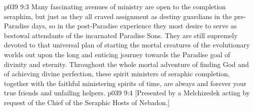 \vs p039 9:3 Many fascinating avenues of ministry are open to the completion seraphim, but just as they all craved assignment as destiny guardians in the pre\hyp{}Paradise days, so in the post\hyp{}Paradise experience they most desire to serve as bestowal attendants of the incarnated Paradise Sons. They are still supremely devoted to that universal plan of starting the mortal creatures of the evolutionary worlds out upon the long and enticing journey towards the Paradise goal of divinity and eternity. Throughout the whole mortal adventure of finding God and of achieving divine perfection, these spirit ministers of seraphic completion, together with the faithful ministering spirits of time, are always and forever your true friends and unfailing helpers.
\vsetoff
\vs p039 9:4 [Presented by a Melchizedek acting by request of the Chief of the Seraphic Hosts of Nebadon.]
\quizlink
